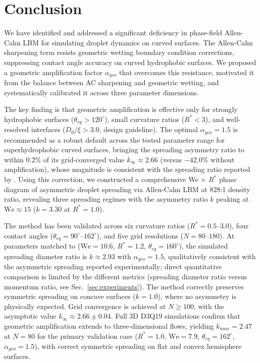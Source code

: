 \section{Conclusion}\label{sec:conclusion}

We have identified and addressed a significant deficiency in phase-field Allen-Cahn LBM for simulating droplet dynamics on curved surfaces. The Allen-Cahn sharpening term resists geometric wetting boundary condition corrections, suppressing contact angle accuracy on curved hydrophobic surfaces. We proposed a geometric amplification factor $\alpha_{geo}$ that overcomes this resistance, motivated it from the balance between AC sharpening and geometric wetting, and systematically calibrated it across three parameter dimensions.

The key finding is that geometric amplification is effective only for strongly hydrophobic surfaces ($\theta_{eq} > 120^\circ$), small curvature ratios ($R^* < 3$), and well-resolved interfaces ($D_0/\xi > 3.0$, design guideline). The optimal $\alpha_{geo} = 1.5$ is recommended as a robust default across the tested parameter range for superhydrophobic curved surfaces, bringing the spreading asymmetry ratio to within $0.2\%$ of its grid-converged value $k_\infty \approx 2.66$ (versus $-42.0\%$ without amplification), whose magnitude is consistent with the spreading ratio reported by \citet{liu2015symmetry}. Using this correction, we constructed a comprehensive We $\times$ $R^*$ phase diagram of asymmetric droplet spreading via Allen-Cahn LBM at 828:1 density ratio, revealing three spreading regimes with the asymmetry ratio $k$ peaking at $\mathrm{We} \approx 15$ ($k = 3.30$ at $R^*=1.0$).

The method has been validated across six curvature ratios ($R^* = 0.5$--$3.0$), four contact angles ($\theta_{eq} = 90^\circ$--$162^\circ$), and five grid resolutions ($N = 80$--$180$). At parameters matched to \citet{liu2015symmetry} ($\mathrm{We}=10.6$, $R^*=1.2$, $\theta_{eq}=160^\circ$), the simulated spreading diameter ratio is $k \approx 2.93$ with $\alpha_{geo}=1.5$, qualitatively consistent with the asymmetric spreading reported experimentally; direct quantitative comparison is limited by the different metrics (spreading diameter ratio versus momentum ratio, see Sec.~\ref{sec:experiments}). The method correctly preserves symmetric spreading on concave surfaces ($k = 1.0$), where no asymmetry is physically expected. Grid convergence is achieved at $N \geq 100$, with the asymptotic value $k_\infty \approx 2.66 \pm 0.04$. Full 3D D3Q19 simulations confirm that geometric amplification extends to three-dimensional flows, yielding $k_{max} = 2.47$ at $N=80$ for the primary validation case ($R^*=1.0$, $\mathrm{We}=7.9$, $\theta_{eq}=162^\circ$, $\alpha_{geo}=1.5$), with correct symmetric spreading on flat and convex hemisphere surfaces.

